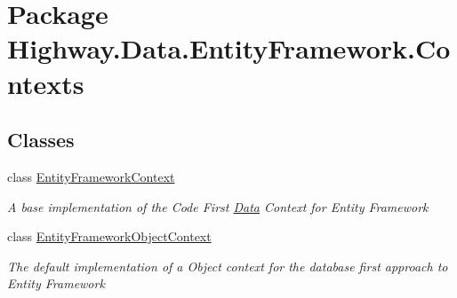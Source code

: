 \hypertarget{namespace_highway_1_1_data_1_1_entity_framework_1_1_contexts}{\section{Package Highway.\-Data.\-Entity\-Framework.\-Contexts}
\label{namespace_highway_1_1_data_1_1_entity_framework_1_1_contexts}
}
\subsection*{Classes}
\begin{DoxyCompactItemize}
\item 
class \hyperlink{class_highway_1_1_data_1_1_entity_framework_1_1_contexts_1_1_entity_framework_context}{Entity\-Framework\-Context}
\begin{DoxyCompactList}\small\item\em A base implementation of the Code First \hyperlink{namespace_highway_1_1_data}{Data} Context for Entity Framework \end{DoxyCompactList}\item 
class \hyperlink{class_highway_1_1_data_1_1_entity_framework_1_1_contexts_1_1_entity_framework_object_context}{Entity\-Framework\-Object\-Context}
\begin{DoxyCompactList}\small\item\em The default implementation of a Object context for the database first approach to Entity Framework \end{DoxyCompactList}\end{DoxyCompactItemize}
